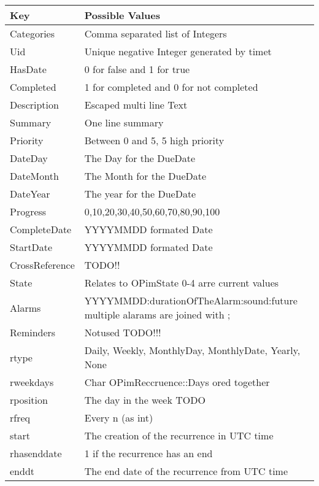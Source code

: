 \begin{tabular}{|l|l|}
\hline
Key            & Possible Values \\ \hline
Categories     & Comma separated list of Integers \\ \hline
Uid            & Unique negative Integer generated by timet \\ \hline
HasDate        & 0 for false and 1 for true \\ \hline
Completed      & 1 for completed and 0 for not completed \\ \hline
Description    & Escaped multi line Text \\ \hline
Summary        & One line summary \\ \hline
Priority       & Between 0 and 5, 5 high priority \\ \hline
DateDay        & The Day for the DueDate \\ \hline
DateMonth      & The Month for the DueDate \\ \hline
DateYear       & The year for the DueDate \\ \hline
Progress       & 0,10,20,30,40,50,60,70,80,90,100 \\ \hline
CompleteDate   & YYYYMMDD formated Date \\ \hline
StartDate      & YYYYMMDD formated Date \\ \hline
CrossReference & TODO!!  \\ \hline
State          & Relates to OPimState 0-4 arre current values \\ \hline
Alarms         & YYYYMMDD:durationOfTheAlarm:sound:future 
                 multiple alarams are joined with ; \\ \hline
Reminders      & Notused TODO!!! \\ \hline
rtype          & Daily, Weekly, MonthlyDay, MonthlyDate, Yearly, None\\ \hline
rweekdays      & Char OPimReccruence::Days ored together \\ \hline
rposition      & The day in the week TODO\\ \hline
rfreq          & Every n (as int) \\ \hline
start          & The creation of the recurrence in UTC time\\ \hline
rhasenddate    & 1 if the recurrence has an end \\ \hline
enddt          & The end date of the recurrence from UTC time\\ \hline
\end{tabular}

